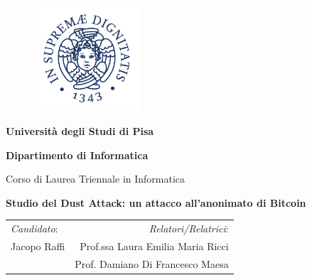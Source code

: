 \begin{titlepage}
\begin{center}
    \begin{figure}
        \centering
        \includegraphics[width=0.35\textwidth]{Images/logo.jpg}
    \end{figure}
    \begin{LARGE}
        {
        \bf Universit\`a degli Studi di Pisa
        }
        \\
        \vskip 0.1cm
    \end{LARGE}

    \begin{Large}
    \textbf {Dipartimento di Informatica}\\
    \end{Large}

    \begin{Large}
    \vskip 0.3cm
    Corso di Laurea Triennale in Informatica
    \end{Large}

\vskip 2cm
\begin{LARGE}
{\bf Studio del Dust Attack: un attacco all'anonimato di Bitcoin}
\\[3mm]
\end{LARGE}

\vskip 2cm

\begin{tabular}{lr}
\normalsize  \textit{Candidato}: &\normalsize \textit{Relatori/Relatrici}:
\\[4mm] \large Jacopo Raffi &\normalsize \hspace{1.5cm}Prof.ssa \large Laura Emilia Maria Ricci

\\[3mm] \large                 &\hspace{1.5cm} \normalsize
Prof. \large Damiano Di Francesco Maesa 


\end{tabular}
\end{center}
\end{titlepage}
